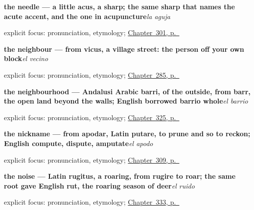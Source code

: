 \noindent\begin{minipage}[t]{\linewidth}
\raggedright
\textbf{the needle — a little acus, a sharp; the same sharp that names the acute accent, and the one in acupuncture}\enspace\emph{la aguja}\par
\footnotesize explicit focus: pronunciation, etymology; \hyperref[ch:mas-cosas-que-pedir]{Chapter~301, p.~\pageref*{ch:mas-cosas-que-pedir}}
\end{minipage}\par\smallskip

\noindent\begin{minipage}[t]{\linewidth}
\raggedright
\textbf{the neighbour — from vicus, a village street: the person off your own block}\enspace\emph{el vecino}\par
\footnotesize explicit focus: pronunciation, etymology; \hyperref[ch:quien-es]{Chapter~285, p.~\pageref*{ch:quien-es}}
\end{minipage}\par\smallskip

\noindent\begin{minipage}[t]{\linewidth}
\raggedright
\textbf{the neighbourhood — Andalusi Arabic barri, of the outside, from barr, the open land beyond the walls; English borrowed barrio whole}\enspace\emph{el barrio}\par
\footnotesize explicit focus: pronunciation, etymology; \hyperref[ch:pais-y-lugar]{Chapter~325, p.~\pageref*{ch:pais-y-lugar}}
\end{minipage}\par\smallskip

\noindent\begin{minipage}[t]{\linewidth}
\raggedright
\textbf{the nickname --- from apodar, Latin putare, to prune and so to reckon; English compute, dispute, amputate}\enspace\emph{el apodo}\par
\footnotesize explicit focus: pronunciation, etymology; \hyperref[ch:familia-y-pareja]{Chapter~309, p.~\pageref*{ch:familia-y-pareja}}
\end{minipage}\par\smallskip

\noindent\begin{minipage}[t]{\linewidth}
\raggedright
\textbf{the noise — Latin rugitus, a roaring, from rugire to roar; the same root gave English rut, the roaring season of deer}\enspace\emph{el ruido}\par
\footnotesize explicit focus: pronunciation, etymology; \hyperref[ch:calma-y-prisa]{Chapter~333, p.~\pageref*{ch:calma-y-prisa}}
\end{minipage}\par\smallskip

